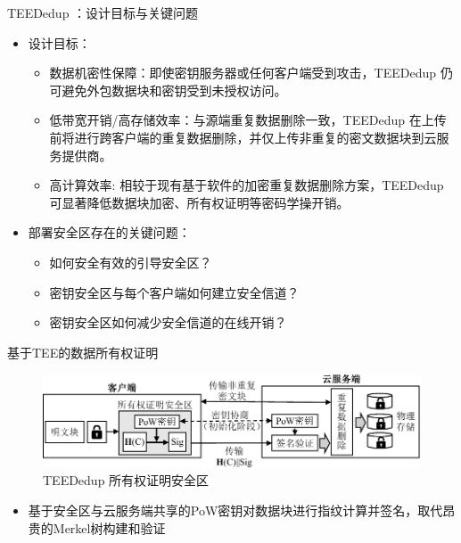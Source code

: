 \documentclass{beamer}
\newcommand{\sysnameS}{TEEDedup }
\begin{document}
\begin{frame}{\sysnameS：设计目标与关键问题}
    \begin{itemize}
        \item 设计目标：
              \begin{itemize}
                  \item 数据机密性保障：即使密钥服务器或任何客户端受到攻击，\sysnameS 仍可避免外包数据块和密钥受到未授权访问。
                  \item 低带宽开销/高存储效率：与源端重复数据删除一致，\sysnameS 在上传前将进行跨客户端的重复数据删除，并仅上传非重复的密文数据块到云服务提供商。
                  \item 高计算效率: 相较于现有基于软件的加密重复数据删除方案，\sysnameS 可显著降低数据块加密、所有权证明等密码学操开销。
              \end{itemize}
        \item 部署安全区存在的关键问题：
              \begin{itemize}
                  \item 如何安全有效的引导安全区？
                  \item 密钥安全区与每个客户端如何建立安全信道？
                  \item 密钥安全区如何减少安全信道的在线开销？
              \end{itemize}
    \end{itemize}
\end{frame}

\begin{frame}{基于TEE的数据所有权证明}
    \begin{figure}[!htb]
        \centering
        \includegraphics[width=\textwidth]{../pic/sgxdedup/pow.pdf}
        \caption{\sysnameS 所有权证明安全区}
        \label{fig:sgxdedup-overview-pow}
    \end{figure}
    \vspace{-1em}
    \begin{itemize}
        \item  基于安全区与云服务端共享的PoW密钥对数据块进行指纹计算并签名，取代昂贵的Merkel树构建和验证
    \end{itemize}
\end{frame}
\end{document}
